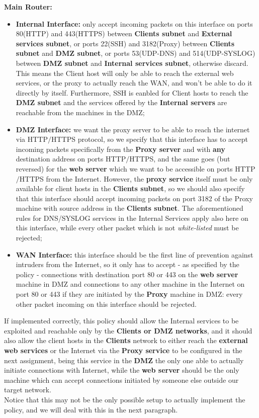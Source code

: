 \textbf{Main Router:}
\begin{itemize}
\item \textbf{Internal Interface:} only accept incoming packets on this interface on ports 80(HTTP) and 443(HTTPS) between \textbf{Clients subnet} and \textbf{External services subnet}, or ports 22(SSH) and 3182(Proxy) between \textbf{Clients subnet} and \textbf{DMZ subnet}, or ports 53(UDP-DNS) and 514(UDP-SYSLOG) between \textbf{DMZ subnet} and \textbf{Internal services subnet}, otherwise discard. This means the Client host will only be able to reach the external web services, or the proxy to actually reach the WAN, and won't be able to do it directly by itself. Furthermore, SSH is eanbled for Client hosts to reach the \textbf{DMZ subnet} and the services offered by the \textbf{Internal servers} are reachable from the machines in the DMZ;
\item \textbf{DMZ Interface:} we want the proxy server to be able to reach the internet via HTTP$/$HTTPS protocol, so we specify that this interface has to accept incoming packets specifically from the \textbf{Proxy server} and with \textbf{any} destination address on ports HTTP$/$HTTPS, and the same goes (but reversed) for the \textbf{web server} which we want to be accessible on ports HTTP$/$HTTPS from the Internet. However, the \textbf{proxy service} itself must be only available for client hosts in the \textbf{Clients subnet}, so we should also specify that this interface should accept incoming packets on port 3182 of the Proxy machine with source address in the \textbf{Clients subnet}. The aforementioned rules for DNS/SYSLOG services in the Internal Services apply also here on this interface, while every other packet which is not \textit{white-listed} must be rejected;
\item \textbf{WAN Interface:} this interface should be the first line of prevention against intruders from the Internet, so it only has to accept - as specified by the policy - connections with destination port 80 or 443 on the \textbf{web server} machine in DMZ and connections to any other machine in the Internet on port 80 or 443 if they are initiated by the \textbf{Proxy} machine in DMZ: every other packet incoming on this interface should be rejected.
\end{itemize}

If implemented correctly, this policy should allow the Internal services to be exploited and reachable only by the \textbf{Clients or DMZ networks}, and it should also allow the client hosts in the \textbf{Clients} network to either reach the \textbf{external web services} or the Internet via the \textbf{Proxy service} to be configured in the next assignment, being this service in the \textbf{DMZ} the only one able to actually initiate connections with Internet, while the \textbf{web server} should be the only machine which can accept connections initiated by someone else outside our target network.\\
Notice that this may not be the only possible setup to actually implement the policy, and we will deal with this in the next paragraph.
